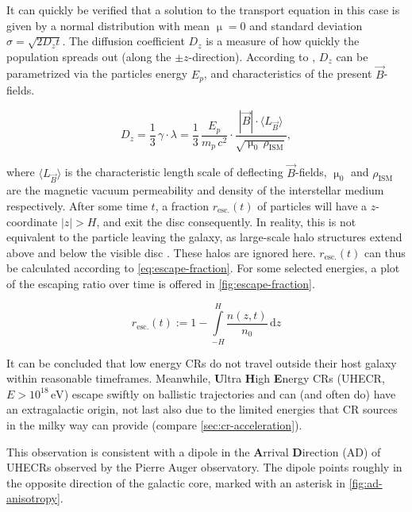 It can quickly be verified that a solution to the transport equation in this case is given by a normal distribution with mean $\upmu = 0$ and standard deviation 
$\sigma = \sqrt{2D_zt}$. The diffusion coefficient $D_z$ is a measure of how quickly the population spreads out (along the $\pm z$-direction). According to 
\cite{skilling1970diffusion}, $D_z$ can be parametrized via the particles energy $E_p$, and characteristics of the present $\vec{B}$-fields.

\begin{equation}
	\label{eq:diffusion-coefficient}
	D_z = \frac{1}{3}\,\gamma\cdot\lambda =\frac{1}{3}\,\frac{E_p}{m_p\,c^2}\cdot\frac{|\vec{B}|\cdot\langle L_{\vec{B}}\rangle}{\sqrt{\upmu_0\,\rho_\text{ISM}}},
\end{equation}

where $\langle L_{\vec{B}} \rangle$ is the characteristic length scale of deflecting $\vec{B}$-fields, $\upmu_0$ and $\rho_\text{ISM}$ are the magnetic vacuum 
permeability and density of the interstellar medium respectively. After some time $t$, a fraction $r_\text{esc.}(t)$ of particles will have a $z$-coordinate 
$|z| > H$, and exit the disc consequently. In reality, this is not equivalent to the particle leaving the galaxy, as large-scale halo structures extend above and 
below the visible disc \cite{searle1978compositions}. These halos are ignored here. $r_\text{esc.}(t)$ can thus be calculated according to 
\autoref{eq:escape-fraction}. For some selected energies, a plot of the escaping ratio over time is offered in \autoref{fig:escape-fraction}.

\begin{equation}
\label{eq:escape-fraction}
r_\text{esc.}(t) := 1 - \int\limits_{-H}^{H} \frac{n(z,t)}{n_0}\,\text{d}z
\end{equation}

It can be concluded that low energy CRs do not travel outside their host galaxy within reasonable timeframes. Meanwhile, \textbf{U}ltra \textbf{H}igh 
\textbf{E}nergy CRs (UHECR, $E>10^{18}\,\text{eV}$) escape swiftly on ballistic trajectories and can (and often do) have an extragalactic origin, not last also due
to the limited energies that CR sources in the milky way can provide (compare \autoref{sec:cr-acceleration}).

This observation is consistent with a dipole in the \textbf{A}rrival \textbf{D}irection (AD) of UHECRs observed by the Pierre Auger observatory. The dipole points
roughly in the opposite direction of the galactic core, marked with an asterisk in \autoref{fig:ad-anisotropy}.

